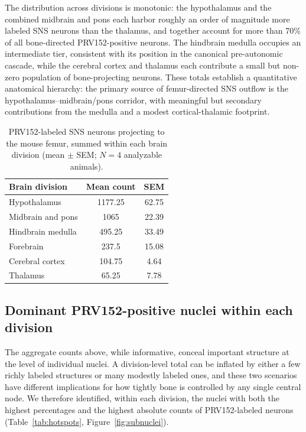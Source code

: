 \documentclass[11pt]{article}
\begin{document}
The distribution across divisions is monotonic: the hypothalamus and the combined midbrain and pons each harbor roughly an order of magnitude more labeled SNS neurons than the thalamus, and together account for more than 70\% of all bone-directed PRV152-positive neurons. The hindbrain medulla occupies an intermediate tier, consistent with its position in the canonical pre-autonomic cascade, while the cerebral cortex and thalamus each contribute a small but non-zero population of bone-projecting neurons. These totals establish a quantitative anatomical hierarchy: the primary source of femur-directed SNS outflow is the hypothalamus--midbrain/pons corridor, with meaningful but secondary contributions from the medulla and a modest cortical-thalamic footprint.

\begin{table}[htbp]
\centering
\caption{PRV152-labeled SNS neurons projecting to the mouse femur, summed within each brain division (mean $\pm$ SEM; $N=4$ analyzable animals).}
\label{tab:counts}
\begin{tabular}{lcc}
\toprule
Brain division & Mean count & SEM \\
\midrule
Hypothalamus & 1177.25 & 62.75 \\
Midbrain and pons & 1065 & 22.39 \\
Hindbrain medulla & 495.25 & 33.49 \\
Forebrain & 237.5 & 15.08 \\
Cerebral cortex & 104.75 & 4.64 \\
Thalamus & 65.25 & 7.78 \\
\bottomrule
\end{tabular}
\end{table}

\subsection{Dominant PRV152-positive nuclei within each division}

The aggregate counts above, while informative, conceal important structure at the level of individual nuclei. A division-level total can be inflated by either a few richly labeled structures or many modestly labeled ones, and these two scenarios have different implications for how tightly bone is controlled by any single central node. We therefore identified, within each division, the nuclei with both the highest percentages and the highest absolute counts of PRV152-labeled neurons (Table~\ref{tab:hotspots}, Figure~\ref{fig:subnuclei}).
\end{document}
